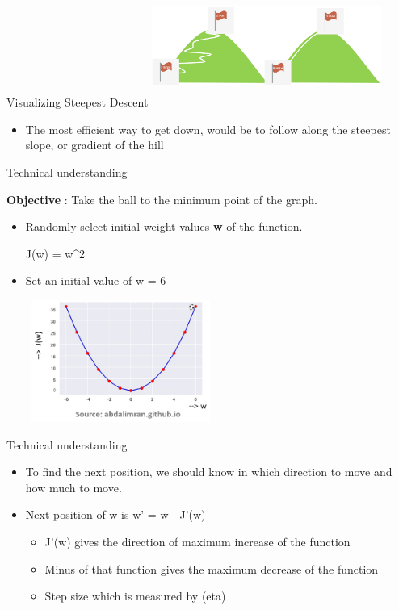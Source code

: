 \documentclass[aspectratio=169,14pt,usenames,dvipsnames]{beamer}
\begin{document}
\begin{frame}{Visualizing Steepest Descent}
\centering
\includegraphics[width=7.5cm , height=4.0cm]{Images/AIML_Percep_IMG16.png}
\begin{itemize}
\item The most efficient way to get down, would be to follow along the steepest slope, or gradient of the hill
\end{itemize}
\end{frame}

\begin{frame}{Technical understanding}
\item \textbf {Objective} : Take the ball to the minimum point of the graph.
\begin{itemize}
\item Randomly select initial weight values \textbf{w} of the function.\\
	\begin {itemize}J(w) = w^2 \end{itemize}
\end{itemize}
\begin{itemize}
\item Set an initial value of w = 6
\end{itemize}

\centering
\includegraphics[width=7.5cm , height=4.0cm]{Images/AIML_Percep_IMG15.png}
\end{frame}

\begin{frame}{Technical understanding}
\begin{itemize}
\item To find the next position, we should know in which direction to move and how much to move.
\item Next position of w is  w' = w - \eta * J'(w) 
  \begin{itemize} 
  \item J'(w)  gives the direction of maximum increase of the function
  \item Minus of that function gives the maximum decrease of the function
  \item Step size which is measured by \eta (eta) 
  \end{itemize}  
\end{itemize}
\end{frame}
\end{document}
